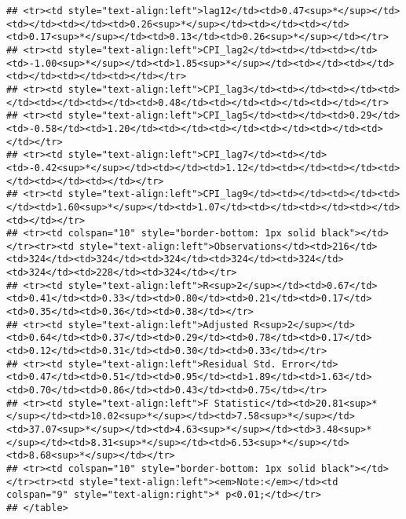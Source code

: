 \documentclass[
]{article}
\begin{document}
\begin{verbatim}
## <tr><td style="text-align:left">lag12</td><td>0.47<sup>*</sup></td><td></td><td></td><td>0.26<sup>*</sup></td><td></td><td></td><td>0.17<sup>*</sup></td><td>0.13</td><td>0.26<sup>*</sup></td></tr>
## <tr><td style="text-align:left">CPI_lag2</td><td></td><td></td><td>-1.00<sup>*</sup></td><td>1.85<sup>*</sup></td><td></td><td></td><td></td><td></td><td></td></tr>
## <tr><td style="text-align:left">CPI_lag3</td><td></td><td></td><td></td><td></td><td></td><td>0.48</td><td></td><td></td><td></td></tr>
## <tr><td style="text-align:left">CPI_lag5</td><td></td><td>0.29</td><td>-0.58</td><td>1.20</td><td></td><td></td><td></td><td></td><td></td></tr>
## <tr><td style="text-align:left">CPI_lag7</td><td></td><td>-0.42<sup>*</sup></td><td></td><td>1.12</td><td></td><td></td><td></td><td></td><td></td></tr>
## <tr><td style="text-align:left">CPI_lag9</td><td></td><td></td><td></td><td>1.60<sup>*</sup></td><td>1.07</td><td></td><td></td><td></td><td></td></tr>
## <tr><td colspan="10" style="border-bottom: 1px solid black"></td></tr><tr><td style="text-align:left">Observations</td><td>216</td><td>324</td><td>324</td><td>324</td><td>324</td><td>324</td><td>324</td><td>228</td><td>324</td></tr>
## <tr><td style="text-align:left">R<sup>2</sup></td><td>0.67</td><td>0.41</td><td>0.33</td><td>0.80</td><td>0.21</td><td>0.17</td><td>0.35</td><td>0.36</td><td>0.38</td></tr>
## <tr><td style="text-align:left">Adjusted R<sup>2</sup></td><td>0.64</td><td>0.37</td><td>0.29</td><td>0.78</td><td>0.17</td><td>0.12</td><td>0.31</td><td>0.30</td><td>0.33</td></tr>
## <tr><td style="text-align:left">Residual Std. Error</td><td>0.47</td><td>0.51</td><td>0.95</td><td>1.89</td><td>1.63</td><td>0.70</td><td>0.86</td><td>0.43</td><td>0.75</td></tr>
## <tr><td style="text-align:left">F Statistic</td><td>20.81<sup>*</sup></td><td>10.02<sup>*</sup></td><td>7.58<sup>*</sup></td><td>37.07<sup>*</sup></td><td>4.63<sup>*</sup></td><td>3.48<sup>*</sup></td><td>8.31<sup>*</sup></td><td>6.53<sup>*</sup></td><td>8.68<sup>*</sup></td></tr>
## <tr><td colspan="10" style="border-bottom: 1px solid black"></td></tr><tr><td style="text-align:left"><em>Note:</em></td><td colspan="9" style="text-align:right">* p<0.01;</td></tr>
## </table>
\end{verbatim}
\end{document}
